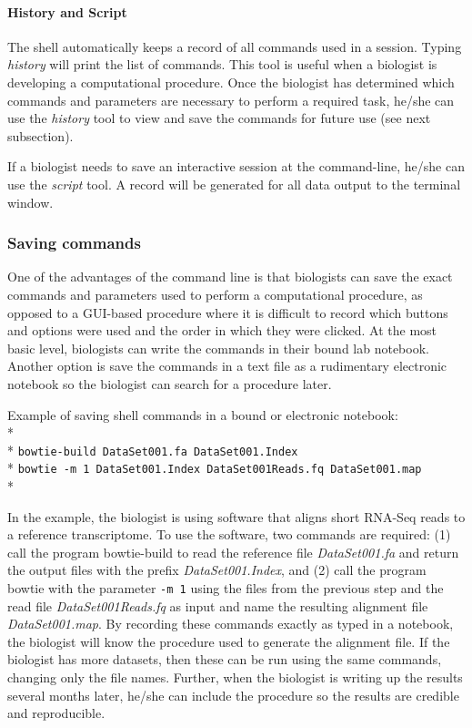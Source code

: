 \documentclass[ChapterTOCs,krantz2]{krantz} %
\begin{document}
\paragraph{History and Script}

The shell automatically keeps a record of all commands used 
in a session.  Typing \emph{history} will print the list of commands.  
This tool is useful when a biologist is developing a computational procedure.  
Once the biologist has determined which commands and parameters 
are necessary to perform a required 
task, he/she can use the \emph{history} tool to view and save the commands for 
future use (see next subsection).

If a biologist needs to save an interactive session at the command-line, 
he/she can use the \emph{script} tool.  A record will be generated 
for all data output to the terminal window.

\subsubsection{Saving commands}

One of the advantages of the command line is
that biologists can save the exact commands and parameters used to perform a
computational procedure, as opposed to a GUI-based procedure where it is
difficult to record which buttons and options were used and the order in which
they were clicked.  At the most basic level, biologists can write the commands
in their bound lab notebook.  Another option is save the commands in a text
file as a rudimentary electronic notebook so the biologist can search for a
procedure later.   

Example of saving shell commands in a bound or electronic notebook:\\* \\*
\texttt{bowtie-build DataSet001.fa DataSet001.Index}\\*
\texttt{bowtie -m 1 DataSet001.Index DataSet001Reads.fq DataSet001.map }\\*

In the example, the biologist is using software that aligns short RNA-Seq reads
to a reference transcriptome.  To use the software, two commands are required:
(1) call the program bowtie-build to read the reference file
\emph{DataSet001.fa} and
return the output files with the prefix \emph{DataSet001.Index},
and (2) call the program bowtie with the parameter \texttt{-m 1} using the files from the
previous step and the read file \emph{DataSet001Reads.fq} as input and name the
resulting alignment file \emph{DataSet001.map}.  By recording these commands exactly
as typed in a notebook, the biologist will know the procedure used to generate
the alignment file.  If the biologist has more datasets, then these can be run
using the same commands, changing only the file names.  Further, when the
biologist is writing up the results several months later, he/she can include
the procedure so the results are credible and reproducible.
\end{document}
